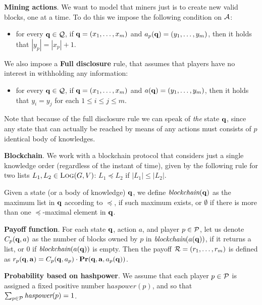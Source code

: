\medskip
\noindent
\textbf{Mining actions}. We want to model that miners just  
is to create new valid blocks, one at a time. To do this we impose the following condition on $\mathcal{A}$: 
\begin{itemize}
\item for every $\mathbf{q} \in \mathcal{Q}$, if $\mathbf{q} = (x_1, \ldots, x_m)$ and $a_p(\mathbf{q}) = (y_1, \ldots, y_m)$, then it holds that $|y_p| = |x_p| + 1$.
\end{itemize}

We also impose a \textbf{Full disclosure} rule, that assumes that players have no interest in withholding any information: 
\begin{itemize}
\item for every $\mathbf{q} \in \mathcal{Q}$, if $\mathbf{q} = (x_1, \ldots, x_m)$ and $a(\mathbf{q}) = (y_1, \ldots, y_m)$, then it holds that $y_i = y_j$ for each $1 \leq i \leq j \leq m$.
\end{itemize} 


Note that because of the full disclosure rule we can speak of \emph{the} state $\mathbf{q}$, since any state that can actually be reached by means of 
any actions must consists of $p$ identical body of knowledges. 


\medskip
\noindent
\textbf{Blockchain}. We work with a blockchain protocol that considers just a single knowledge order (regardless of the instant of time), 
given by the following rule for two lists $L_1, L_2 \in \text{\sc Log}(G,V)$: $L_1 \preceq L_2$ if $|L_1| \leq |L_2|$. 

\newcommand{\blockchain}{\textit{blockchain}}
\newcommand{\hashpower}{\textit{haspower}}

Given a state (or a body of knowledge) $\mathbf{q}$, we define $\blockchain(\bq)$ as the maximum list in $\mathbf{q}$ according to $\preceq$, if 
such maximum exists, or $\emptyset$ if there is more than one $\preceq$-maximal element in $\mathbf{q}$. 


\medskip
\noindent
\textbf{Payoff function}. For each state $\mathbf{q}$, action $a$, and player $p \in \mathcal{P}$, let us denote $C_p(\mathbf{q},a)$ 
as the number of blocks owned by $p$ in $\blockchain(a(\bq))$, if it returns a list, or $0$ if $\blockchain(a(\bq))$ is empty. 
Then the payoff $\mathcal{R} = (r_1, \ldots, r_m)$ is defined as $r_p(\mathbf{q}, \mathbf{a}) = C_p(\mathbf{q}, a_p) \cdot \mathbf{Pr}(\mathbf{q}, \mathbf{a}, a_p(\mathbf{q}))$.

\medskip
\noindent
\textbf{Probability based on hashpower}. We assume that each player $p \in \mathcal{P}$ is assigned a fixed positive number $\hashpower(p)$, 
and so that $\sum_{p \in \cP} \hashpower(p) = 1$. 

